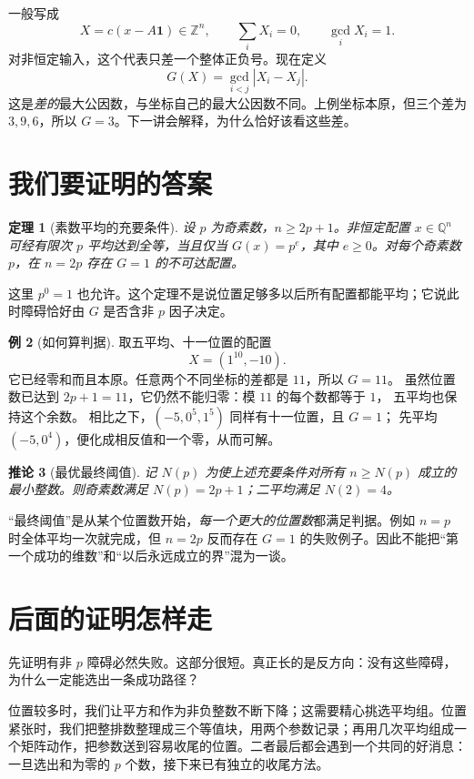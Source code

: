 \documentclass[11pt,a4paper,oneside,openany]{book}
\newcommand{\Z}{\mathbb Z}
\newcommand{\Q}{\mathbb Q}
\newtheorem{theorem}{定理}[chapter]
\newtheorem{corollary}[theorem]{推论}
\theoremstyle{definition}
\newtheorem{example}[theorem]{例}
\numberwithin{equation}{chapter}
\begin{document}
一般写成
\[X=c(x-A\mathbf1)\in\Z^n,\qquad \sum_iX_i=0,\qquad\gcd_iX_i=1.
\]
对非恒定输入，这个代表只差一个整体正负号。现在定义
\begin{equation}\label{eq:G}
G(X)=\gcd_{i<j}|X_i-X_j|.
\end{equation}
这是\emph{差的}最大公因数，与坐标自己的最大公因数不同。上例坐标本原，但三个差为 $3,9,6$，所以 $G=3$。下一讲会解释，为什么恰好该看这些差。

\section{我们要证明的答案}
\begin{theorem}[素数平均的充要条件]\label{thm:prime}
设 $p$ 为奇素数，$n\ge2p+1$。非恒定配置 $x\in\Q^n$ 可经有限次 $p$ 平均达到全等，当且仅当 $G(x)=p^e$，其中 $e\ge0$。对每个奇素数 $p$，在 $n=2p$ 存在 $G=1$ 的不可达配置。
\end{theorem}
这里 $p^0=1$ 也允许。这个定理不是说位置足够多以后所有配置都能平均；它说此时障碍恰好由 $G$ 是否含非 $p$ 因子决定。
\begin{example}[如何算判据]
取五平均、十一位置的配置
\[
X=(1^{10},-10).
\]
它已经零和而且本原。任意两个不同坐标的差都是 $11$，所以 $G=11$。
虽然位置数已达到 $2p+1=11$，它仍然不能归零：模 $11$ 的每个数都等于 $1$，
五平均也保持这个余数。
相比之下，$(-5,0^5,1^5)$ 同样有十一位置，且 $G=1$；
先平均 $(-5,0^4)$，便化成相反值和一个零，从而可解。
\end{example}
\begin{corollary}[最优最终阈值]\label{cor:threshold}
记 $N(p)$ 为使上述充要条件对所有 $n\ge N(p)$ 成立的最小整数。则奇素数满足 $N(p)=2p+1$；二平均满足 $N(2)=4$。
\end{corollary}
“最终阈值”是从某个位置数开始，\emph{每一个更大的位置数}都满足判据。例如 $n=p$ 时全体平均一次就完成，但 $n=2p$ 反而存在 $G=1$ 的失败例子。因此不能把“第一个成功的维数”和“以后永远成立的界”混为一谈。

\section{后面的证明怎样走}
先证明有非 $p$ 障碍必然失败。这部分很短。真正长的是反方向：没有这些障碍，为什么一定能选出一条成功路径？

位置较多时，我们让平方和作为非负整数不断下降；这需要精心挑选平均组。位置紧张时，我们把整排数整理成三个等值块，用两个参数记录；再用几次平均组成一个矩阵动作，把参数送到容易收尾的位置。二者最后都会遇到一个共同的好消息：一旦选出和为零的 $p$ 个数，接下来已有独立的收尾方法。
\end{document}
